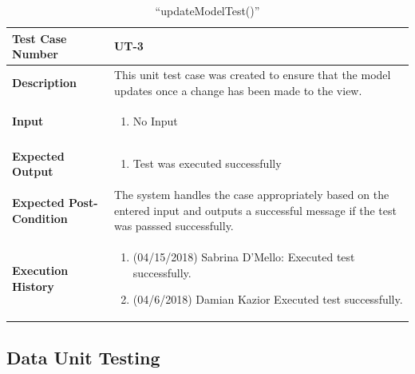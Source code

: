 \documentclass[12pt]{article}
\begin{document}
\begin{table}[H]
\caption{“updateModelTest()”}
\begin{center}
\begin{tabular}{|p{5.5cm}|p{11cm}|}
  \hline
  \bf Test Case Number & UT-3\\\hline
  \bf Description & 
  This unit test case was created to ensure that the model  updates once a change has been made to the view.\\\hline
  \bf Input &
  \begin{enumerate}
  \item No Input
  \end{enumerate}
  \\\hline
  \bf Expected Output &
  \begin{enumerate}
  \item Test was executed successfully
  \end{enumerate}
  \\\hline
  \bf Expected Post-Condition & 
  The system handles the case appropriately based on the entered input and outputs a successful message if the test was passsed successfully.
  \\\hline   
  \bf Execution History & 
  \begin{enumerate}
  \item (04/15/2018) Sabrina D’Mello: Executed test successfully.
  \item (04/6/2018) Damian Kazior Executed test successfully.
  \end{enumerate}
  \\\hline
\end{tabular}
\end{center}
\end{table}


\subsection{Data Unit Testing} \label{ut:2}
\end{document}
